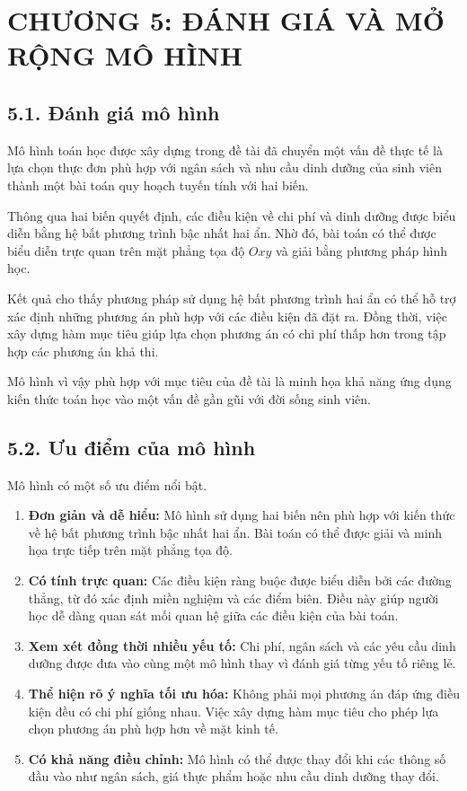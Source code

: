 \documentclass[12pt,a4paper]{article}
\begin{document}
\newpage

\section*{CHƯƠNG 5: ĐÁNH GIÁ VÀ MỞ RỘNG MÔ HÌNH}

\subsection*{5.1. Đánh giá mô hình}

Mô hình toán học được xây dựng trong đề tài đã chuyển một vấn đề
thực tế là lựa chọn thực đơn phù hợp với ngân sách và nhu cầu dinh
dưỡng của sinh viên thành một bài toán quy hoạch tuyến tính với hai
biến.

Thông qua hai biến quyết định, các điều kiện về chi phí và dinh dưỡng
được biểu diễn bằng hệ bất phương trình bậc nhất hai ẩn. Nhờ đó, bài
toán có thể được biểu diễn trực quan trên mặt phẳng tọa độ $Oxy$ và
giải bằng phương pháp hình học.

Kết quả cho thấy phương pháp sử dụng hệ bất phương trình hai ẩn có
thể hỗ trợ xác định những phương án phù hợp với các điều kiện đã đặt
ra. Đồng thời, việc xây dựng hàm mục tiêu giúp lựa chọn phương án có
chi phí thấp hơn trong tập hợp các phương án khả thi.

Mô hình vì vậy phù hợp với mục tiêu của đề tài là minh họa khả năng
ứng dụng kiến thức toán học vào một vấn đề gần gũi với đời sống sinh
viên.

\subsection*{5.2. Ưu điểm của mô hình}

Mô hình có một số ưu điểm nổi bật.
\begin{enumerate}
    \item \textbf{Đơn giản và dễ hiểu:} Mô hình sử dụng hai biến nên
    phù hợp với kiến thức về hệ bất phương trình bậc nhất hai ẩn.
    Bài toán có thể được giải và minh họa trực tiếp trên mặt phẳng
    tọa độ.
    \item \textbf{Có tính trực quan:} Các điều kiện ràng buộc được
    biểu diễn bởi các đường thẳng, từ đó xác định miền nghiệm và các
    điểm biên. Điều này giúp người học dễ dàng quan sát mối quan hệ
    giữa các điều kiện của bài toán.
    \item \textbf{Xem xét đồng thời nhiều yếu tố:} Chi phí, ngân sách
    và các yêu cầu dinh dưỡng được đưa vào cùng một mô hình thay vì
    đánh giá từng yếu tố riêng lẻ.
    \item \textbf{Thể hiện rõ ý nghĩa tối ưu hóa:} Không phải mọi
    phương án đáp ứng điều kiện đều có chi phí giống nhau. Việc xây
    dựng hàm mục tiêu cho phép lựa chọn phương án phù hợp hơn về mặt
    kinh tế.
    \item \textbf{Có khả năng điều chỉnh:} Mô hình có thể được thay
    đổi khi các thông số đầu vào như ngân sách, giá thực phẩm hoặc
    nhu cầu dinh dưỡng thay đổi.
\end{enumerate}
\end{document}
